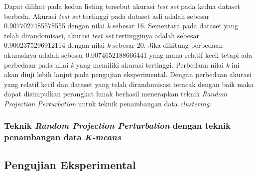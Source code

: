 Dapat dilihat pada kedua listing tersebut akurasi \textit{test set} pada kedua dataset berbeda. Akurasi \textit{test set} tertinggi pada dataset asli adalah sebesar 0.9077027485578555 dengan nilai \textit{k} sebesar 16. Sementara pada dataset yang telah dirandomisasi, akurasi \textit{test set} tertingginya adalah sebesar 0.9002375296912114 dengan nilai \textit{k} sebesar 20. Jika dihitung perbedaan akurasinya adalah sebesar 0.0074652188666441 yang mana relatif kecil tetapi ada perbedaan pada nilai \textit{k} yang memiliki akurasi tertinggi. Perbedaan nilai \textit{k} ini akan diuji lebih lanjut pada pengujian eksperimental. Dengan perbedaan akurasi yang relatif kecil dan dataset yang telah dirandomisasi teracak dengan baik maka dapat disimpulkan perangkat lunak berhasil menerapkan teknik \textit{Random Projection Perturbation} untuk teknik penambangan data \textit{clustering}.



\subsubsection{Teknik \textit{Random Projection Perturbation} dengan teknik penambangan data \textit{K-means}}
\label{sec:rpp-kmeans}

\subsection{Pengujian Eksperimental}
\label{sec:pengujianeksperimental}